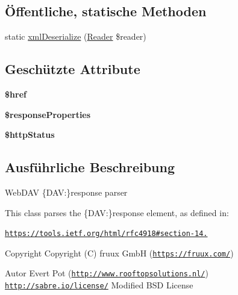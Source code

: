 \subsection*{Öffentliche, statische Methoden}
\begin{DoxyCompactItemize}
\item 
static \mbox{\hyperlink{class_sabre_1_1_d_a_v_1_1_xml_1_1_element_1_1_response_a5a98f2e83398af04daf6f99138288d4b}{xml\+Deserialize}} (\mbox{\hyperlink{class_sabre_1_1_xml_1_1_reader}{Reader}} \$reader)
\end{DoxyCompactItemize}
\subsection*{Geschützte Attribute}
\begin{DoxyCompactItemize}
\item 
\mbox{\label{class_sabre_1_1_d_a_v_1_1_xml_1_1_element_1_1_response_a95e1a2ca01e279e303e27d9ab0bd0fe6}} 
{\bfseries \$href}
\item 
\mbox{\label{class_sabre_1_1_d_a_v_1_1_xml_1_1_element_1_1_response_a18beaa63de346f257ef8e45749039334}} 
{\bfseries \$response\+Properties}
\item 
\mbox{\label{class_sabre_1_1_d_a_v_1_1_xml_1_1_element_1_1_response_a1b2e23a1da0d593f4de470a7473696db}} 
{\bfseries \$http\+Status}
\end{DoxyCompactItemize}


\subsection{Ausführliche Beschreibung}
Web\+D\+AV \{D\+AV\+:\}response parser

This class parses the \{D\+AV\+:\}response element, as defined in\+:

\href{https://tools.ietf.org/html/rfc4918#section-14.24}{\tt https\+://tools.\+ietf.\+org/html/rfc4918\#section-\/14.}

\begin{DoxyCopyright}{Copyright}
Copyright (C) fruux GmbH (\href{https://fruux.com/}{\tt https\+://fruux.\+com/}) 
\end{DoxyCopyright}
\begin{DoxyAuthor}{Autor}
Evert Pot (\href{http://www.rooftopsolutions.nl/}{\tt http\+://www.\+rooftopsolutions.\+nl/})  \href{http://sabre.io/license/}{\tt http\+://sabre.\+io/license/} Modified B\+SD License 
\end{DoxyAuthor}


